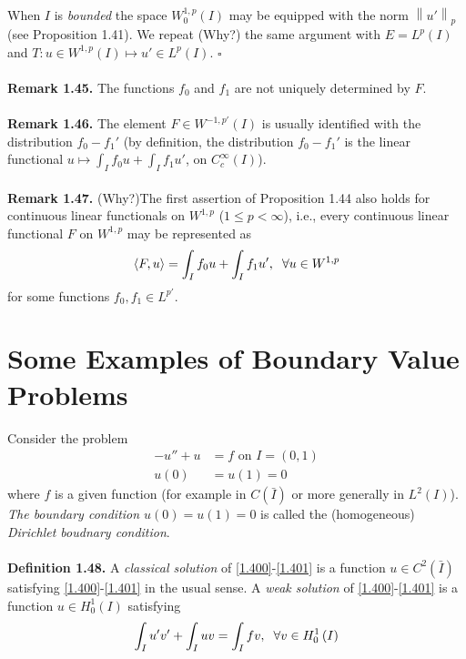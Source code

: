 \documentclass[a4paper,oneside]{article}
\numberwithin{equation}{section}
\begin{document}
When $I$ is \textit{bounded} the space $W_0^{1,p}\left(I\right)$ may be equipped with the norm ${\left\| {u'} \right\|_p}$ (see Proposition 1.41). We repeat  (Why?) the same argument with $E=L^p\left(I\right)$ and $T:u \in {W^{1,p}}\left( I \right) \mapsto u' \in {L^p}\left( I \right)$. \hfill $\square$\\
\\
\textbf{Remark 1.45.} The functions $f_0$ and $f_1$ are not uniquely determined by $F$.\\
\\
\textbf{Remark 1.46.} The element $F\in W^{-1,p'}\left(I\right)$ is usually identified with the distribution $f_0-f_1'$ (by definition, the distribution $f_0-f_1'$ is the linear functional $u \mapsto \int_I {{f_0}u}  + \int_I {{f_1}u'} $, on $C_c^{\infty} \left(I\right)$).\\
\\
\textbf{Remark 1.47.}  (Why?)The first assertion of Proposition  1.44 also holds for continuous linear functionals on $W^{1,p}$ ($1\le p<\infty$), i.e., every continuous linear functional $F$ on $W^{1,p}$ may be represented as
\begin{align}
\left\langle {F,u} \right\rangle  = \int_I {{f_0}u}  + \int_I {{f_1}u'} ,\hspace{0.2cm}\forall u \in {W^{1,p}}
\end{align}
for some functions $f_0,f_1\in L^{p'}$.
\section{Some Examples of Boundary Value Problems}
Consider the problem
\begin{align}
\label{1.400}
 - u'' + u &= f\mbox{ on } I = \left( {0,1} \right)\\
u\left( 0 \right) &= u\left( 1 \right) = 0 \label{1.401}
\end{align}
where $f$ is a given function (for example in $C\left(\bar I\right)$ or more generally in $L^2\left(I\right)$). \textit{The boundary condition $u\left(0\right)=u\left(1\right)=0$} is called the (homogeneous) \textit{Dirichlet boudnary condition}.\\
\\
\textbf{Definition 1.48.} A \textit{classical solution} of \eqref{1.400}-\eqref{1.401} is a function $u\in C^2\left(\bar I\right)$ satisfying \eqref{1.400}-\eqref{1.401} in the usual sense. A \textit{weak solution} of \eqref{1.400}-\eqref{1.401} is a function $u\in H_0^1\left(I\right)$ satisfying
\begin{align}
\label{1.402}
\int_I {u'v'}  + \int_I {uv}  = \int_I {fv} ,\hspace{0.2cm}\forall v \in H_0^1\left( I \right)
\end{align}
\end{document}
